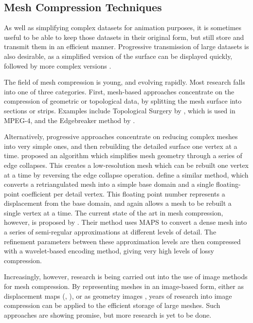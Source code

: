 \subsection{\label{sec:litreview:modeling:compression}Mesh Compression Techniques}

As well as simplifying complex datasets for animation purposes, it is sometimes useful to be able to keep those datasets in their original form, but still store and transmit them in an efficient manner. Progressive transmission of large datasets is also desirable, as a simplified version of the surface can be displayed quickly, followed by more complex versions \cite{King01}.

The field of mesh compression is young, and evolving rapidly. Most research falls into one of three categories. First, mesh-based approaches concentrate on the compression of geometric or topological data, by splitting the mesh surface into sections or strips. Examples include Topological Surgery by \citet{Taubin98}, which is used in MPEG-4, and the Edgebreaker method by \citet{Rossignac99}.

Alternatively, progressive approaches concentrate on reducing complex meshes into very simple ones, and then rebuilding the detailed surface one vertex at a time. \citet{Hoppe96} proposed an algorithm which simplifies mesh geometry through a series of edge collapses. This creates a low-resolution mesh which can be rebuilt one vertex at a time by reversing the edge collapse operation. \citet{Guskov00} define a similar method, which converts a retriangulated mesh into a simple base domain and a single floating-point coefficient per detail vertex. This floating point number represents a displacement from the base domain, and again allows a mesh to be rebuilt a single vertex at a time. The current state of the art in mesh compression, however, is proposed by \citet{Khodakovsky00}. Their method uses MAPS \cite{Lee98} to convert a dense mesh into a series of semi-regular approximations at different levels of detail. The refinement parameters between these approximation levels are then compressed with a wavelet-based encoding method, giving very high levels of lossy compression.

Increasingly, however, research is being carried out into the use of image methods for mesh compression. By representing meshes in an image-based form, either as displacement maps (\cite{Lee00}, \cite{Krishnamurthy96}), or as geometry images \cite{Gu02}, years of research into image compression can be applied to the efficient storage of large meshes. Such approaches are showing promise, but more research is yet to be done.

